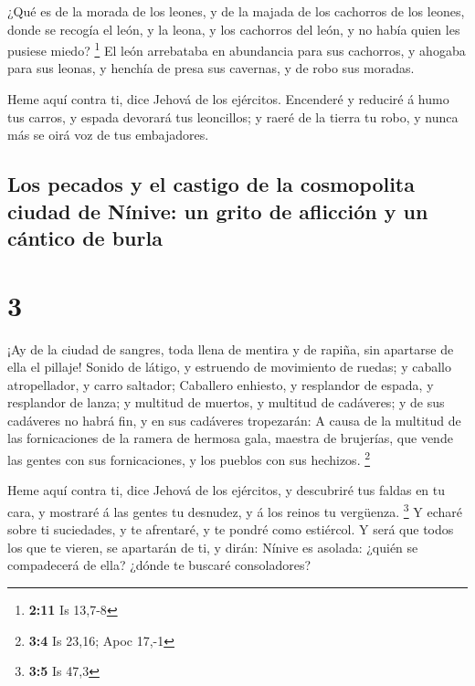  ¿Qué es de la morada de los leones, y de la majada de
los cachorros de los leones, donde se recogía el león, y la leona, y los
cachorros del león, y no había quien les pusiese miedo? \footnote{\textbf{2:11}
  Is 13,7-8}  El león arrebataba en abundancia para sus
cachorros, y ahogaba para sus leonas, y henchía de presa sus cavernas, y
de robo sus moradas.

 Heme aquí contra ti, dice Jehová de los ejércitos.
Encenderé y reduciré á humo tus carros, y espada devorará tus
leoncillos; y raeré de la tierra tu robo, y nunca más se oirá voz de tus
embajadores.

\hypertarget{los-pecados-y-el-castigo-de-la-cosmopolita-ciudad-de-nuxednive-un-grito-de-aflicciuxf3n-y-un-cuxe1ntico-de-burla}{%
\subsection{Los pecados y el castigo de la cosmopolita ciudad de Nínive:
un grito de aflicción y un cántico de
burla}\label{los-pecados-y-el-castigo-de-la-cosmopolita-ciudad-de-nuxednive-un-grito-de-aflicciuxf3n-y-un-cuxe1ntico-de-burla}}

\hypertarget{section-2}{%
\section{3}\label{section-2}}

 ¡Ay de la ciudad de sangres, toda llena de mentira y de
rapiña, sin apartarse de ella el pillaje!  Sonido de
látigo, y estruendo de movimiento de ruedas; y caballo atropellador, y
carro saltador;  Caballero enhiesto, y resplandor de
espada, y resplandor de lanza; y multitud de muertos, y multitud de
cadáveres; y de sus cadáveres no habrá fin, y en sus cadáveres
tropezarán:  A causa de la multitud de las fornicaciones
de la ramera de hermosa gala, maestra de brujerías, que vende las gentes
con sus fornicaciones, y los pueblos con sus hechizos. \footnote{\textbf{3:4}
  Is 23,16; Apoc 17,-1}

 Heme aquí contra ti, dice Jehová de los ejércitos, y
descubriré tus faldas en tu cara, y mostraré á las gentes tu desnudez, y
á los reinos tu vergüenza. \footnote{\textbf{3:5} Is 47,3}
 Y echaré sobre ti suciedades, y te afrentaré, y te pondré
como estiércol.  Y será que todos los que te vieren, se
apartarán de ti, y dirán: Nínive es asolada: ¿quién se compadecerá de
ella? ¿dónde te buscaré consoladores?

